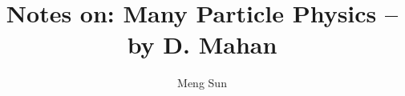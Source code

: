 \documentclass{tufte-book}
\title{Notes on: Many Particle Physics --by D. Mahan}
\author{Meng Sun}
\begin{document}
\maketitle
\tableofcontents











{}

\end{document}
